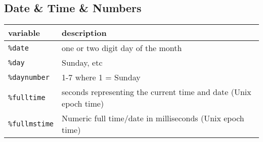 \documentclass[]{article}
\begin{document}
\subsection{Date \& Time \& Numbers}\label{date-time-numbers}

\begin{longtable}[]{@{}ll@{}}
\toprule
\begin{minipage}[b]{0.12\columnwidth}\raggedright\strut
variable\strut
\end{minipage} & \begin{minipage}[b]{0.61\columnwidth}\raggedright\strut
description\strut
\end{minipage}\tabularnewline
\midrule
\endhead
\begin{minipage}[t]{0.12\columnwidth}\raggedright\strut
\texttt{\%date}\strut
\end{minipage} & \begin{minipage}[t]{0.61\columnwidth}\raggedright\strut
one or two digit day of the month\strut
\end{minipage}\tabularnewline
\begin{minipage}[t]{0.12\columnwidth}\raggedright\strut
\texttt{\%day}\strut
\end{minipage} & \begin{minipage}[t]{0.61\columnwidth}\raggedright\strut
Sunday, etc\strut
\end{minipage}\tabularnewline
\begin{minipage}[t]{0.12\columnwidth}\raggedright\strut
\texttt{\%daynumber}\strut
\end{minipage} & \begin{minipage}[t]{0.61\columnwidth}\raggedright\strut
1-7 where 1 = Sunday\strut
\end{minipage}\tabularnewline
\begin{minipage}[t]{0.12\columnwidth}\raggedright\strut
\texttt{\%fulltime}\strut
\end{minipage} & \begin{minipage}[t]{0.61\columnwidth}\raggedright\strut
seconds representing the current time and date (Unix epoch time)\strut
\end{minipage}\tabularnewline
\begin{minipage}[t]{0.12\columnwidth}\raggedright\strut
\texttt{\%fullmstime}\strut
\end{minipage} & \begin{minipage}[t]{0.61\columnwidth}\raggedright\strut
Numeric full time/date in milliseconds (Unix epoch time)\strut
\end{minipage}\tabularnewline

\end{longtable}
\end{document}
